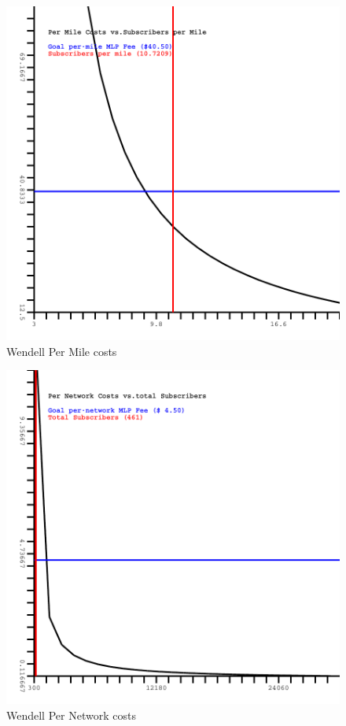 \documentclass[12pt]{article}
\begin{document}
\begin{figure}[Hptb]
\begin{centering}
\includegraphics[width=5in]{WENDELL-PerMile.pdf}
\caption{Wendell Per Mile costs}
\label{fig:WENDELLPM}
\end{centering}
\end{figure}
\begin{figure}[Hpbt]
\begin{centering}
\includegraphics[width=5in]{WENDELL-PerNetwork.pdf}
\caption{Wendell Per Network costs}
\label{fig:WENDELLPN}
\end{centering}
\end{figure}
\end{document}
